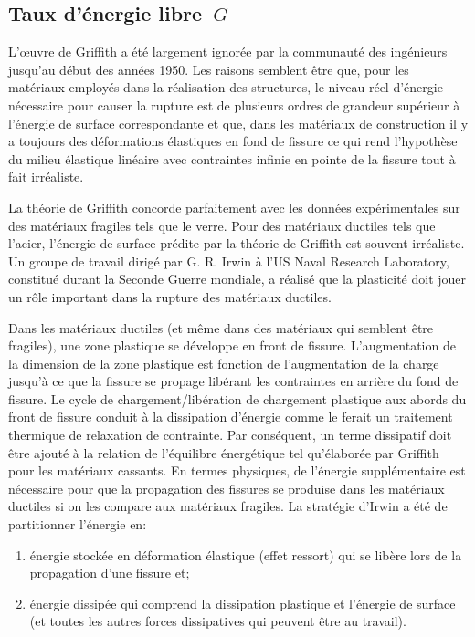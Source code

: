 \medskip
\subsection{Taux d'énergie libre~$G$}

\medskip
\begin{histoire}%
L'œuvre de Griffith a été largement ignorée par
la communauté des ingénieurs jusqu'au début des années 1950.
Les raisons semblent être que, pour les matériaux employés dans la réalisation des structures,
le niveau réel d'énergie nécessaire pour causer la rupture est de plusieurs ordres de grandeur
supérieur à l'énergie de surface correspondante et que, dans les matériaux de construction il
y a toujours des déformations élastiques en fond de fissure ce qui rend l'hypothèse du milieu
élastique linéaire avec contraintes infinie en pointe de la fissure tout à fait irréaliste.

\medskip
La théorie de Griffith concorde parfaitement avec
les données expérimentales sur des matériaux fragiles tels que le verre. Pour des matériaux ductiles
tels que l'acier, l'énergie de surface prédite par la théorie de Griffith
est souvent irréaliste.
Un groupe de travail dirigé par G. R. Irwin à
l'US Naval Research Laboratory, constitué durant la Seconde Guerre mondiale, a réalisé que la plasticité
doit jouer un rôle important dans la rupture des matériaux ductiles.

\medskip
Dans les matériaux ductiles (et même dans des matériaux qui semblent être fragiles), une zone
plastique se développe en front de fissure.
L'augmentation de la dimension de la zone plastique est fonction de l'augmentation de la charge jusqu'à
ce que la fissure se propage libérant les contraintes en arrière du fond de fissure.
Le cycle de chargement/libération de chargement plastique aux abords du front de fissure conduit à
la dissipation d'énergie comme le ferait un traitement thermique de relaxation de contrainte.
Par conséquent, un terme dissipatif doit être ajouté à la relation de l'équilibre énergétique tel
qu'élaborée par Griffith pour les matériaux cassants.
En termes physiques, de l'énergie supplémentaire est nécessaire pour que la propagation des fissures
se produise dans les matériaux ductiles si on les compare aux matériaux fragiles.
\medskipvm
La stratégie d'Irwin a été de partitionner
l'énergie en:
\begin{enumerate}
\item énergie stockée en déformation élastique (effet ressort) qui se libère lors de la propagation
d'une fissure et;
\item énergie dissipée qui comprend la dissipation plastique et l'énergie de surface (et toutes les autres
forces dissipatives qui peuvent être au travail).
\end{enumerate}
\end{histoire}

